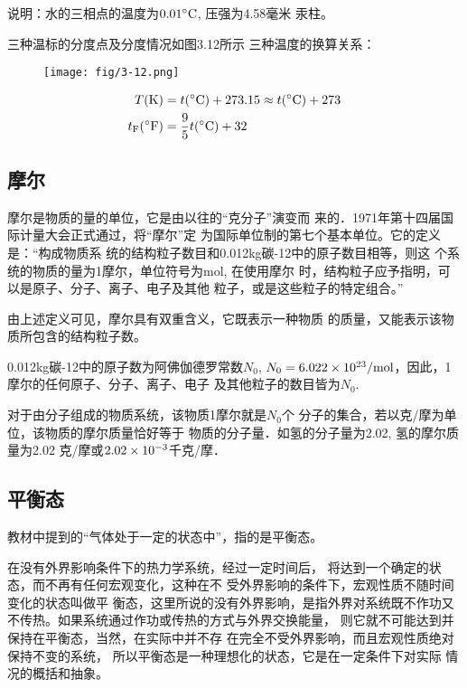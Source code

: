 说明：水的三相点的温度为$0.01^{\circ}{\rm C}$, 压强为4.58毫米
汞柱。

三种温标的分度点及分度情况如图3.12所示
三种温度的换算关系：
\begin{figure}[htp]
    \centering
    \texttt{[image: fig/3-12.png]}
    \caption{}
\end{figure}

\[\begin{split}
   T({\rm K}) &= t({\rm ^{\circ}C})+273.15\approx t({\rm ^{\circ}C})+273\\
   t_{\rm F}({\rm ^{\circ}F})&=\frac{9}{5}t({\rm ^{\circ}C})+32 
\end{split}\]

\subsection{摩尔}
摩尔是物质的量的单位，它是由以往的“克分子”演变而
来的．1971年第十四届国际计量大会正式通过，将“摩尔”定
为国际单位制的第七个基本单位。它的定义是：“构成物质系
统的结构粒子数目和0.012kg碳-12中的原子数目相等，则这
个系统的物质的量为1摩尔，单位符号为mol, 在使用摩尔
时，结构粒子应予指明，可以是原子、分子、离子、电子及其他
粒子，或是这些粒子的特定组合。”

由上述定义可见，摩尔具有双重含义，它既表示一种物质
的质量，又能表示该物质所包含的结构粒子数。

0.012kg碳-12中的原子数为阿佛伽德罗常数$N_0$, $N_0=6.022\times10^{23}/{\rm mol}$，因此，1摩尔的任何原子、分子、离子、电子
及其他粒子的数目皆为$N_0$.

对于由分子组成的物质系统，该物质1摩尔就是$N_0$个
分子的集合，若以克/摩为单位，该物质的摩尔质量恰好等于
物质的分子量．如氢的分子量为2.02, 氢的摩尔质量为2.02
克/摩或$2.02\times10^{-3}$千克/摩．

\subsection{平衡态}
教材中提到的“气体处于一定的状态中”，指的是平衡态。

在没有外界影响条件下的热力学系统，经过一定时间后，
将达到一个确定的状态，而不再有任何宏观变化，这种在不
受外界影响的条件下，宏观性质不随时间变化的状态叫做平
衡态，这里所说的没有外界影响，是指外界对系统既不作功又
不传热。如果系统通过作功或传热的方式与外界交换能量，
则它就不可能达到并保持在平衡态，当然，在实际中并不存
在完全不受外界影响，而且宏观性质绝对保持不变的系统，
所以平衡态是一种理想化的状态，它是在一定条件下对实际
情况的概括和抽象。

